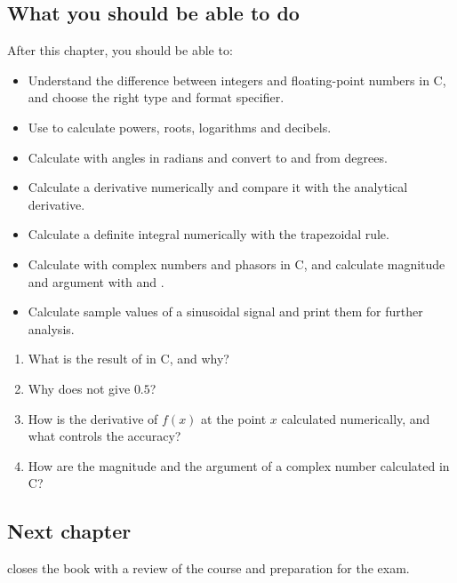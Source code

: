 \subsection*{What you should be able to do}
After this chapter, you should be able to:
\begin{itemize}
  \item Understand the difference between integers and floating-point numbers in C, and choose the
    right type and format specifier.
  \item Use  to calculate powers, roots, logarithms and decibels.
  \item Calculate with angles in radians and convert to and from degrees.
  \item Calculate a derivative numerically and compare it with the analytical derivative.
  \item Calculate a definite integral numerically with the trapezoidal rule.
  \item Calculate with complex numbers and phasors in C, and calculate magnitude and argument with
     and .
  \item Calculate sample values of a sinusoidal signal and print them for further analysis.
\end{itemize}

\testadigsjalv
\begin{enumerate}
  \item What is the result of  in C, and why?
  \item Why does  not give $0.5$?
  \item How is the derivative of $f(x)$ at the point $x$ calculated numerically, and what controls
    the accuracy?
  \item How are the magnitude and the argument of a complex number calculated in C?
\end{enumerate}

\subsection*{Next chapter}
 closes the book with a review of the course and preparation for the exam.
